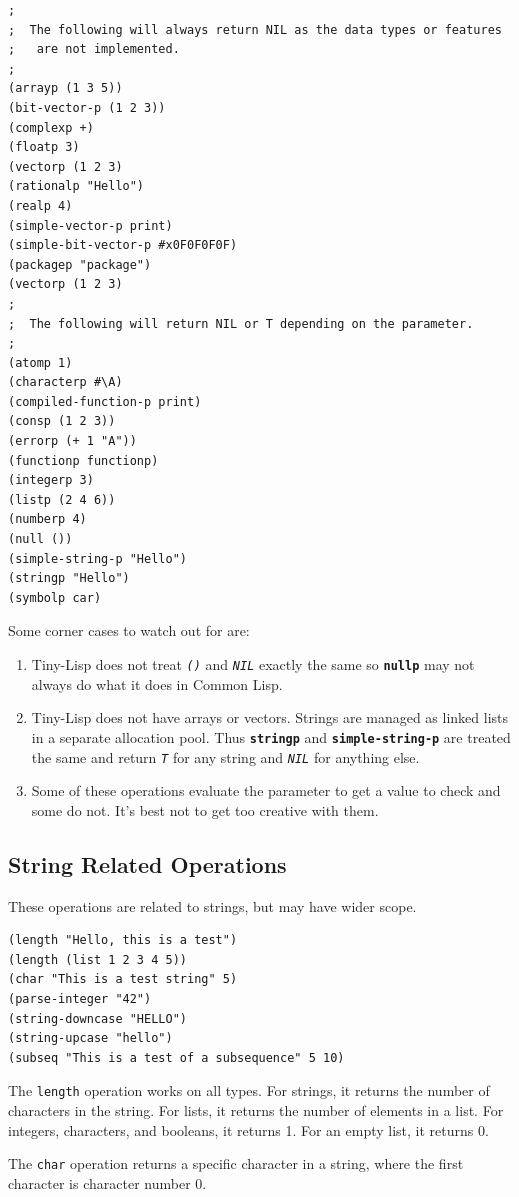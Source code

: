 \documentclass[10pt, openany]{book}
\newcommand{\operation}[1]{\textbf{\texttt{#1}}}
\newcommand{\function}[1]{\texttt{#1}}
\newcommand{\constant}[1]{\emph{\texttt{#1}}}
\newcommand{\tl}{Tiny-Lisp}
\newcommand{\cl}{Common Lisp}
\begin{document}
\begin{lstlisting}
;
;  The following will always return NIL as the data types or features
;   are not implemented.
;
(arrayp (1 3 5))
(bit-vector-p (1 2 3))
(complexp +)
(floatp 3)
(vectorp (1 2 3)
(rationalp "Hello")
(realp 4)
(simple-vector-p print)
(simple-bit-vector-p #x0F0F0F0F)
(packagep "package")
(vectorp (1 2 3)
;
;  The following will return NIL or T depending on the parameter.
;
(atomp 1)
(characterp #\A)
(compiled-function-p print)
(consp (1 2 3))
(errorp (+ 1 "A"))
(functionp functionp)
(integerp 3)
(listp (2 4 6))
(numberp 4)
(null ())
(simple-string-p "Hello")
(stringp "Hello")
(symbolp car)
\end{lstlisting}

Some corner cases to watch out for are:
\begin{enumerate}
  \item \tl{} does not treat \constant{()} and \constant{NIL} exactly the same so \operation{nullp} may not always do what it does in \cl.
  \item \tl{} does not have arrays or vectors.  Strings are managed as linked lists in a separate allocation pool.  Thus \operation{stringp} and \operation{simple-string-p} are treated the same and return \constant{T} for any string and \constant{NIL} for anything else.
  \item Some of these operations evaluate the parameter to get a value to check and some do not.  It's best not to get too creative with them.
\end{enumerate}

\subsection{String Related Operations}
These operations are related to strings, but may have wider scope.
\begin{lstlisting}
(length "Hello, this is a test")
(length (list 1 2 3 4 5))
(char "This is a test string" 5)
(parse-integer "42")
(string-downcase "HELLO")
(string-upcase "hello")
(subseq "This is a test of a subsequence" 5 10)
\end{lstlisting}

The \function{length} operation works on all types.  For strings, it returns the number of characters in the string.  For lists, it returns the number of elements in a list.  For integers, characters, and booleans, it returns 1.  For an empty list, it returns 0.

The \function{char} operation returns a specific character in a string, where the first character is character number 0.
\end{document}
